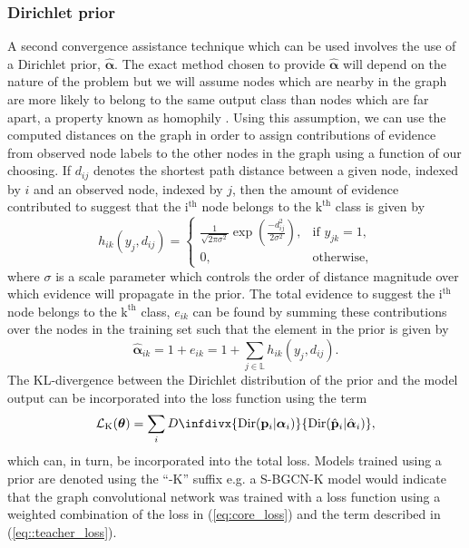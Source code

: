 \documentclass[
twocolumn,
]{ceurart}
\newcommand{\infdiv}{D\infdivx}
\begin{document}
\subsubsection{Dirichlet prior}
A second convergence assistance technique which can be used involves the use of a Dirichlet prior, $\hat{\boldsymbol{\alpha}}$.
The exact method chosen to provide $\hat{\boldsymbol{\alpha}}$ will depend on the nature of the problem but we will assume nodes which are nearby in the graph are more likely to belong to the same output class than nodes which are far apart, a property known as homophily \cite{HuangQian2019}.
Using this assumption, we can use the computed distances on the graph in order to assign contributions of evidence from observed node labels to the other nodes in the graph using a function of our choosing.
If $d_{ij}$ denotes the shortest path distance between a given node, indexed by $i$ and an observed node, indexed by $j$, then the amount of evidence contributed to suggest that the $\text{i}^\text{th}$ node belongs to the $\text{k}^\text{th}$ class is given by
\begin{equation}
    h_{ik}(y_j,d_{ij})=
    \begin{cases}
    \frac{1}{\sqrt{2\pi\sigma^2}}\exp{\left(\frac{-d_{ij}^2}{2\sigma^2}\right)}, & \text{if } y_{jk}=1,\\
    0, & \text{otherwise},
    \end{cases}
\end{equation}
where $\sigma$ is a scale parameter which controls the order of distance magnitude over which evidence will propagate in the prior.
The total evidence to suggest the $\text{i}^\text{th}$ node belongs to the $\text{k}^\text{th}$ class, $e_{ik}$ can be found by summing these contributions over the nodes in the training set such that the element in the prior is given by 
\begin{equation}
    \hat{\boldsymbol{\alpha}}_{ik}=1+e_{ik}=1+\sum_{j\in\mathbb{L}}h_{ik}(y_j, d_{ij}).
\end{equation}
The KL-divergence between the Dirichlet distribution of the prior and the model output can be incorporated into the loss function using the term
\begin{equation}
    \mathcal{L}_{\text{K}}(\boldsymbol{\theta})=\sum_i\infdiv{\text{Dir}(\mathbf{p}_i\vert\boldsymbol{\alpha}_i)}{\text{Dir}(\hat{\mathbf{p}}_i\vert\hat{\boldsymbol{\alpha}}_i)},
\label{eq::teacher_loss}
\end{equation}
which can, in turn, be incorporated into the total loss.
Models trained using a prior are denoted using the ``-K'' suffix e.g. a S-BGCN-K model would indicate that the graph convolutional network was trained with a loss function using a weighted combination of the loss in (\ref{eq:core_loss}) and the term described in (\ref{eq::teacher_loss}).
\end{document}

